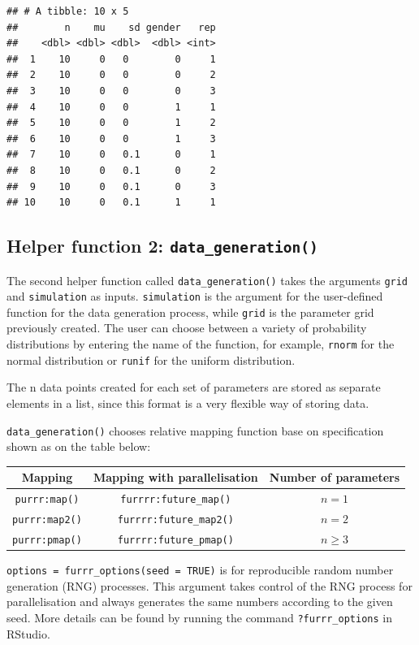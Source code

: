 \documentclass[11pt,a4paper]{article}
\begin{document}
\begin{verbatim}
## # A tibble: 10 x 5
##        n    mu    sd gender   rep
##    <dbl> <dbl> <dbl>  <dbl> <int>
##  1    10     0   0        0     1
##  2    10     0   0        0     2
##  3    10     0   0        0     3
##  4    10     0   0        1     1
##  5    10     0   0        1     2
##  6    10     0   0        1     3
##  7    10     0   0.1      0     1
##  8    10     0   0.1      0     2
##  9    10     0   0.1      0     3
## 10    10     0   0.1      1     1
\end{verbatim}

\hypertarget{helper-function-2-data_generation}{%
\subsection{\texorpdfstring{Helper function 2:
\texttt{data\_generation()}}{Helper function 2: data\_generation()}}\label{helper-function-2-data_generation}}

The second helper function called \texttt{data\_generation()} takes the
arguments \texttt{grid} and \texttt{simulation} as inputs.
\texttt{simulation} is the argument for the user-defined function for
the data generation process, while \texttt{grid} is the parameter grid
previously created. The user can choose between a variety of probability
distributions by entering the name of the function, for example,
\texttt{rnorm} for the normal distribution or \texttt{runif} for the
uniform distribution.

The n data points created for each set of parameters are stored as
separate elements in a list, since this format is a very flexible way of
storing data.

\texttt{data\_generation()} chooses relative mapping function base on
specification shown as on the table below:

\begin{longtable}[]{@{}ccc@{}}
\toprule()
Mapping & Mapping with parallelisation & Number of parameters \\
\midrule()
\endhead
\texttt{purrr:map()} & \texttt{furrrr:future\_map()} & \(n = 1\) \\
\texttt{purrr:map2()} & \texttt{furrrr:future\_map2()} & \(n = 2\) \\
\texttt{purrr:pmap()} & \texttt{furrrr:future\_pmap()} & \(n \geq 3\) \\
\bottomrule()
\end{longtable}

\texttt{options\ =\ furrr\_options(seed\ =\ TRUE)} is for reproducible
random number generation (RNG) processes. This argument takes control of
the RNG process for parallelisation and always generates the same
numbers according to the given seed. More details can be found by
running the command \texttt{?furrr\_options} in RStudio.
\end{document}
